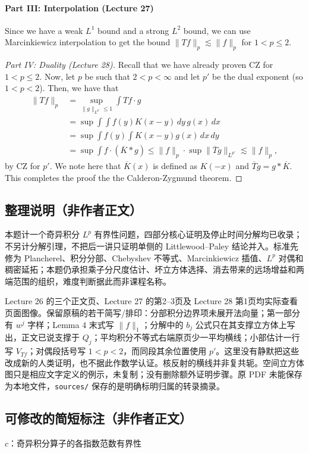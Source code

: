 \documentclass[UTF8,11pt]{ctexart}
\theoremstyle{definition}
\begin{document}
\paragraph{Part III: Interpolation (Lecture 27)}
Since we have a weak $L^1$ bound and a strong $L^2$ bound, we can use Marcinkiewicz interpolation to get the bound $\|Tf\|_p\lesssim\|f\|_p$ for $1<p\leq2$.
\begin{proof}[Part IV: Duality (Lecture 28)]
Recall that we have already proven CZ for $1<p\leq2$. Now, let $p$ be such that $2<p<\infty$ and let $p'$ be the dual exponent (so $1<p<2$). Then, we have that
\begin{align*}
\|Tf\|_p&=\sup_{\|g\|_{L^{p'}}\leq1}\int Tf\cdot g\\
&=\sup\int\!\int f(y)K(x-y)\,dy\,g(x)\,dx\\
&=\sup\int f(y)\int K(x-y)g(x)\,dx\,dy\\
&=\sup\int f\cdot(\overline K*g)
\leq\|f\|_p\cdot\sup\|\overline T g\|_{L^{p'}}\lesssim\|f\|_p,
\end{align*}
by CZ for $p'$. We note here that $\overline K(x)$ is defined as $K(-x)$ and $\overline T g=g*\overline K$. This completes the proof the the Calderon-Zygmund theorem.
\end{proof}
\subsection*{整理说明（非作者正文）}
本题计一个奇异积分 $L^p$ 有界性问题，四部分核心证明及停止时间分解均已收录；不另计分解引理，不把后一讲只证明单侧的 Littlewood--Paley 结论并入。标准先修为 Plancherel、积分分部、Chebyshev 不等式、Marcinkiewicz 插值、$L^p$ 对偶和稠密延拓；本题仍承担乘子分尺度估计、坏立方体选择、消去带来的远场增益和两端范围的组织，难度判断据此而非课程名称。

Lecture 26 的三个正文页、Lecture 27 的第2--3页及 Lecture 28 第1页均实际查看页面图像。保留原稿的若干简写/排印：分部积分边界项未展开法向量；第一部分有 $w^j$ 字样；Lemma 4 末式写 $\|f\|_1$；分解中的 $b_j$ 公式只在其支撑立方体上写出，正文已说支撑于 $Q_j$；平均积分不等式右端原页少一平均横线；小部估计一行写 $V_{Tf}$；对偶段括号写 $1<p<2$，而同段其余位置使用 $p'$。这里没有静默把这些改成新的人类证明，也不据此作数学认证。核反射的横线并非复共轭。空间立方体图只是相应文字定义的例示，未复制；没有删除额外证明步骤。原 PDF 未能保存为本地文件，\texttt{sources/} 保存的是明确标明归属的转录摘录。
\subsection*{可修改的简短标注（非作者正文）}
$c$：奇异积分算子的各指数范数有界性
\end{document}
